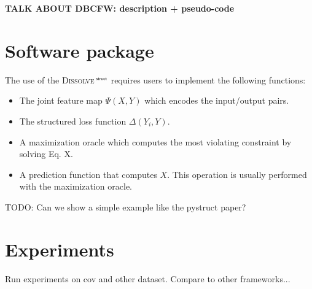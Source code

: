 \documentclass[twoside,11pt]{article}
\newcommand{\algname}{\textsc{Dissolve}$\,^{\textsf{\tiny struct}}$\xspace}
\newcommand{\vectornorm}[1]{\left|\left|#1\right|\right|}
\newcommand{\comment}[1]{}
\newcommand{\w}{{\bf w}}
\begin{document}
\comment{
Not sure we need this:
This is usually formulated as a quadratic program (QP) with
soft margin constraints~\cite{Tsochantaridis04}:
%
\begin{eqnarray}
\label{eq:ssvm_primal}
& & \min_{\w,\bm{\xi}\geq\mathbf{0}} \frac{\lambda}{2} \vectornorm{\w}^2 + 
	\sum_{n=1}^N \xi_n 
\\
\nonumber
& & \mbox{s.t. } \forall \; n: S_\mathbf{w}(Y^n) \geq  \max_{Y \in \mathcal{Y}_n}(S_\mathbf{w}(Y) + \Delta(Y^n,Y)) - \xi_n,
\end{eqnarray}
%
where $\mathcal{Y}_n$ is the set of all possible labelings for example
$n$, the constant $\lambda$ controls the trade-off between margin and
training error, and the \emph{task loss} $\Delta$ measures the closeness of any inferred labeling $Y$ to the ground truth labeling $Y^n$.
}

{\bf TALK ABOUT DBCFW: description + pseudo-code}

\section{Software package}

The use of the \algname requires users to implement the following functions:
\begin{itemize}
\item The joint feature map $\Psi(X,Y)$ which encodes the input/output pairs.
\item The structured loss function $\Delta(Y_i,Y)$.
\item A maximization oracle which computes the most violating constraint by solving Eq. X.
\item A prediction function that computes $X$. This operation is usually performed with the maximization oracle.
\end{itemize}

TODO: Can we show a simple example like the pystruct paper?

\section{Experiments}

Run experiments on cov and other dataset. Compare to other frameworks...

\end{document}
